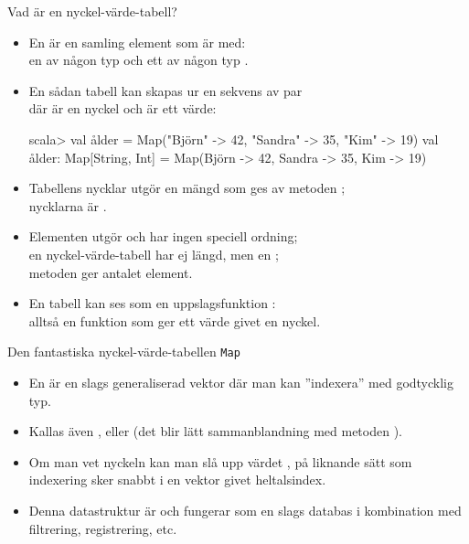   






\begin{Slide}{Vad är en nyckel-värde-tabell?}\SlideFontSmall
\begin{itemize}
\item En  är en samling element som är  med:\\
en  av någon typ  och ett  av någon typ .
\item En sådan tabell kan skapas ur en sekvens av par \\
där  är en nyckel och  är ett värde:
\begin{REPL}
scala> val ålder = Map("Björn" -> 42, "Sandra" -> 35, "Kim" -> 19)
val ålder: Map[String, Int] = Map(Björn -> 42, Sandra -> 35, Kim -> 19)
\end{REPL}
\item Tabellens nycklar utgör en mängd som ges av metoden ;\\
nycklarna är .
\item Elementen utgör  och har ingen speciell ordning;
\\en nyckel-värde-tabell har ej längd, men en ;\\metoden {} ger antalet element.
\pause
\item En tabell kan ses som en uppslagsfunktion :\\alltså en funktion  som ger ett värde givet en nyckel.
\end{itemize}
\end{Slide}


\begin{Slide}{Den fantastiska nyckel-värde-tabellen \texttt{Map}}\SlideFontSmall
\begin{itemize}
\item En   är en slags generaliserad vektor där man kan ''indexera'' med godtycklig typ.

\item Kallas även \href{https://sv.wikipedia.org/wiki/Hashtabell}{} ,   eller   (det blir lätt sammanblandning med metoden ).

\item Om man vet nyckeln kan man slå upp värdet , på liknande sätt som indexering sker snabbt i en vektor givet heltalsindex.

\item Denna datastruktur är  och fungerar som en slags databas i kombination med filtrering, registrering, etc.
\end{itemize}
\end{Slide}


